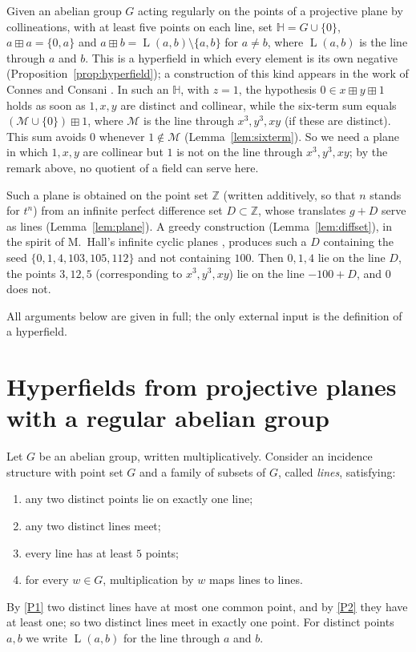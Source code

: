 \documentclass[11pt]{article}
\theoremstyle{definition}
\theoremstyle{remark}
\newcommand{\HH}{\mathbb{H}}
\newcommand{\Z}{\mathbb{Z}}
\newcommand{\bp}{\boxplus}
\DeclareMathOperator{\Ln}{L}
\begin{document}
Given an abelian group $G$ acting regularly on the points of a projective plane by collineations, with at least five points on each line, set $\HH=G\cup\{0\}$, $a\bp a=\{0,a\}$ and $a\bp b=\Ln(a,b)\setminus\{a,b\}$ for $a\neq b$, where $\Ln(a,b)$ is the line through $a$ and $b$. This is a hyperfield in which every element is its own negative (Proposition~\ref{prop:hyperfield}); a construction of this kind appears in the work of Connes and Consani \cite{CC}. In such an $\HH$, with $z=1$, the hypothesis $0\in x\bp y\bp 1$ holds as soon as $1,x,y$ are distinct and collinear, while the six-term sum equals $(\mathcal M\cup\{0\})\bp 1$, where $\mathcal M$ is the line through $x^3,y^3,xy$ (if these are distinct). This sum avoids $0$ whenever $1\notin\mathcal M$ (Lemma~\ref{lem:sixterm}). So we need a plane in which $1,x,y$ are collinear but $1$ is not on the line through $x^3,y^3,xy$; by the remark above, no quotient of a field can serve here.


Such a plane is obtained on the point set $\Z$ (written additively, so that $n$ stands for $t^n$) from an infinite perfect difference set $D\subset\Z$, whose translates $g+D$ serve as lines (Lemma~\ref{lem:plane}). A greedy construction (Lemma~\ref{lem:diffset}), in the spirit of M.~Hall's infinite cyclic planes \cite{Hall}, produces such a $D$ containing the seed $\{0,1,4,103,105,112\}$ and not containing $100$. Then $0,1,4$ lie on the line $D$, the points $3,12,5$ (corresponding to $x^3,y^3,xy$) lie on the line $-100+D$, and $0$ does not.

All arguments below are given in full; the only external input is the definition of a hyperfield.

\section{Hyperfields from projective planes with a regular abelian group}\label{sec:planes}

Let $G$ be an abelian group, written multiplicatively. Consider an incidence structure with point set $G$ and a family of subsets of $G$, called \emph{lines}, satisfying:
\begin{enumerate}[label=\textup{(P\arabic*)},nosep]
\item\label{P1} any two distinct points lie on exactly one line;
\item\label{P2} any two distinct lines meet;
\item\label{P3} every line has at least $5$ points;
\item\label{P4} for every $w\in G$, multiplication by $w$ maps lines to lines.
\end{enumerate}
By \ref{P1} two distinct lines have at most one common point, and by \ref{P2} they have at least one; so two distinct lines meet in exactly one point. For distinct points $a,b$ we write $\Ln(a,b)$ for the line through $a$ and $b$.
\end{document}
